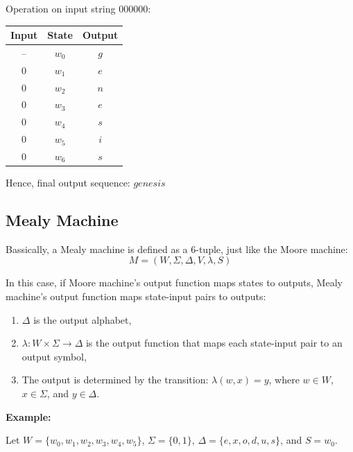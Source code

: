 \documentclass[12pt,a4paper,openany]{article}
\begin{document}
\begin{enumerate}
Operation on input string $000000$:

        \begin{center}
        \begin{tabular}{c|c|c}
        \textbf{Input} & \textbf{State} & \textbf{Output} \\
        \hline
        -- & $w_0$ & $g$ \\
        $0$ & $w_1$ & $e$ \\
        $0$ & $w_2$ & $n$ \\
        $0$ & $w_3$ & $e$ \\
        $0$ & $w_4$ & $s$ \\
        $0$ & $w_5$ & $i$ \\
        $0$ & $w_6$ & $s$ \\
        \end{tabular}
        \end{center}

        Hence, final output sequence: $\boxed{genesis}$

\end{enumerate}

\subsection{Mealy Machine}

Bassically, a Mealy machine is defined as a 6-tuple, just like the Moore machine:   
\[M = (W, \Sigma, \Delta, V, \lambda, S)\]

In this case, if Moore machine's output function maps states to outputs, Mealy machine's output function maps state-input pairs to outputs:
\begin{enumerate}
    \item $\Delta$ is the output alphabet,
    \item $\lambda: W \times \Sigma \to \Delta$ is the output function that maps each state-input pair to an output symbol,
    \item The output is determined by the transition: $\lambda(w, x) = y$, where $w \in W$, $x \in \Sigma$, and $y \in \Delta$.
\end{enumerate}

\textbf{Example:}

Let $W = \{w_0, w_1, w_2, w_3, w_4, w_5\}$, $\Sigma = \{0, 1\}$, $\Delta = \{e, x, o, d, u, s\}$, and $S = w_0$.
\end{document}
